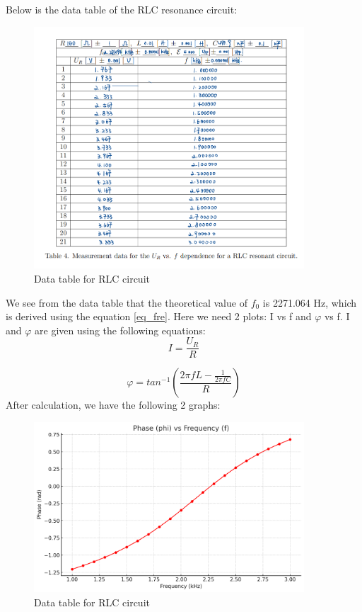 \documentclass[12pt, a4paper, oneside]{article}
\begin{document}
Below is the data table of the RLC resonance circuit:
\begin{figure}[htbp]
	\centering
	\includegraphics[width=0.9\textwidth]{C4.png}
	\caption{Data table for RLC circuit}
\end{figure}

We see from the data table that the theoretical value of $f_0$ is 2271.064 Hz, which is derived using the equation \ref{eq_fre}. 
Here we need 2 plots: I vs f and $\varphi$ vs f. I and $\varphi$ are given using the following 
equations: 
\begin{equation}
	I=\frac{U_R}{R}
\end{equation}

\begin{equation}
	\varphi=tan^{-1}(\frac{2\pi fL-\frac{1}{2\pi fC}}{R})
\end{equation}
After calculation, we have the following 2 graphs:

\begin{figure}[htbp]
	\centering
	\includegraphics[width=0.9\textwidth]{C5.png}
	\caption{Data table for RLC circuit}
\end{figure}
\end{document}
